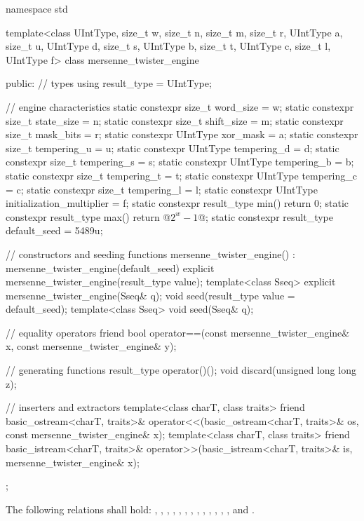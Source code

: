 %
%
\begin{codeblock}
namespace std {
  template<class UIntType, size_t w, size_t n, size_t m, size_t r,
           UIntType a, size_t u, UIntType d, size_t s,
           UIntType b, size_t t,
           UIntType c, size_t l, UIntType f>
  class mersenne_twister_engine {
  public:
    // types
    using result_type = UIntType;

    // engine characteristics
    static constexpr size_t word_size = w;
    static constexpr size_t state_size = n;
    static constexpr size_t shift_size = m;
    static constexpr size_t mask_bits = r;
    static constexpr UIntType xor_mask = a;
    static constexpr size_t tempering_u = u;
    static constexpr UIntType tempering_d = d;
    static constexpr size_t tempering_s = s;
    static constexpr UIntType tempering_b = b;
    static constexpr size_t tempering_t = t;
    static constexpr UIntType tempering_c = c;
    static constexpr size_t tempering_l = l;
    static constexpr UIntType initialization_multiplier = f;
    static constexpr result_type min() { return 0; }
    static constexpr result_type max() { return  @$2^w - 1$@; }
    static constexpr result_type default_seed = 5489u;

    // constructors and seeding functions
    mersenne_twister_engine() : mersenne_twister_engine(default_seed) {}
    explicit mersenne_twister_engine(result_type value);
    template<class Sseq> explicit mersenne_twister_engine(Sseq& q);
    void seed(result_type value = default_seed);
    template<class Sseq> void seed(Sseq& q);

    // equality operators
    friend bool operator==(const mersenne_twister_engine& x, const mersenne_twister_engine& y);

    // generating functions
    result_type operator()();
    void discard(unsigned long long z);

    // inserters and extractors
    template<class charT, class traits>
      friend basic_ostream<charT, traits>&
        operator<<(basic_ostream<charT, traits>& os, const mersenne_twister_engine& x);
    template<class charT, class traits>
      friend basic_istream<charT, traits>&
        operator>>(basic_istream<charT, traits>& is, mersenne_twister_engine& x);
  };
}
\end{codeblock}

\pnum
The following relations shall hold:
  ,
  ,
  ,
  ,
  ,
  ,
  ,
  ,
  ,
  ,
  ,
  ,
  ,
and
  .

